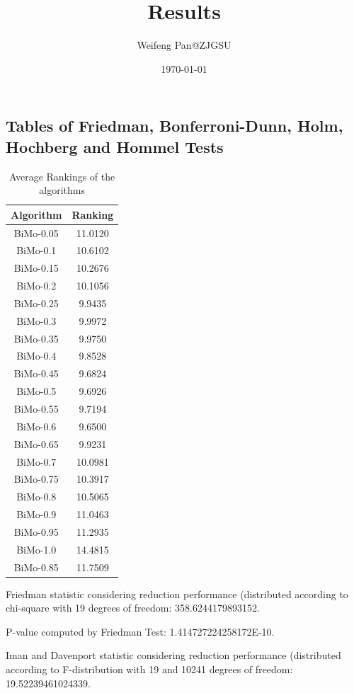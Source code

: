 \documentclass[a4paper,10pt]{article}
\title{Results}
\author{Weifeng Pan@ZJGSU}
\date{\today}
\begin{document}
\begin{landscape}
\oddsidemargin 0in \topmargin 0in\maketitle
\section{Tables of Friedman, Bonferroni-Dunn, Holm, Hochberg and Hommel Tests}
\begin{table}[!htp]
\centering
\caption{Average Rankings of the algorithms
}\begin{tabular}{c|c}
Algorithm&Ranking\\
\hline
BiMo-0.05&11.0120\\
BiMo-0.1&10.6102\\
BiMo-0.15&10.2676\\
BiMo-0.2&10.1056\\
BiMo-0.25&9.9435\\
BiMo-0.3&9.9972\\
BiMo-0.35&9.9750\\
BiMo-0.4&9.8528\\
BiMo-0.45&9.6824\\
BiMo-0.5&9.6926\\
BiMo-0.55&9.7194\\
BiMo-0.6&9.6500\\
BiMo-0.65&9.9231\\
BiMo-0.7&10.0981\\
BiMo-0.75&10.3917\\
BiMo-0.8&10.5065\\
BiMo-0.9&11.0463\\
BiMo-0.95&11.2935\\
BiMo-1.0&14.4815\\
BiMo-0.85&11.7509\\
\end{tabular}
\end{table}


Friedman statistic considering reduction performance (distributed according to chi-square with 19 degrees of freedom: 358.6244179893152.


P-value computed by Friedman Test: 1.414727224258172E-10.\newline

Iman and Davenport statistic considering reduction performance (distributed according to F-distribution with 19 and 10241 degrees of freedom: 19.52239461024339.



\end{landscape}
\end{document}
